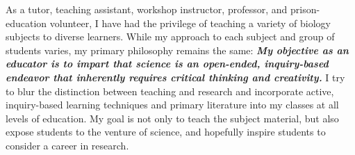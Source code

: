 As a tutor, teaching assistant, workshop
instructor, professor, and prison-education volunteer,
I have had the privilege of teaching a variety of biology subjects to
diverse learners.
While my approach to each subject and group of students varies, my primary
philosophy remains the same:
\textbf{\textit{My objective as an educator is to impart that
        science
        is an open-ended, inquiry-based endeavor that inherently requires
        critical thinking and creativity.}}
I try to blur the distinction between teaching and research and incorporate
active, inquiry-based learning techniques and primary literature into my
classes at all levels of
education.
My goal is not only to teach the subject material, but also expose students to
the venture of science, and hopefully inspire students to consider a
career in research.

